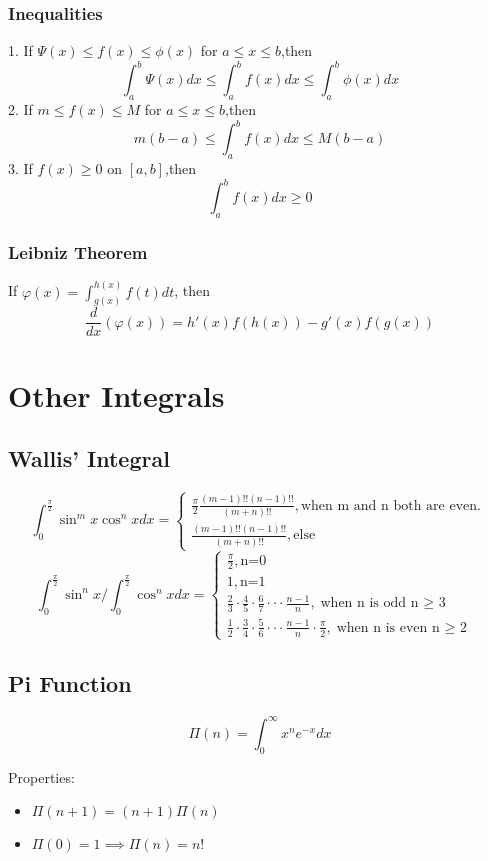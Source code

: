 \documentclass[12pt]{article}
\begin{document}
\subsubsection{Inequalities}
1. If $\Psi(x) \le f(x) \le \phi(x)$  for $a \le x \le b$,then
$$\int_{a}^{b}\Psi(x)dx \le \int_{a}^{b}f(x)dx \le \int_{a}^{b}\phi(x)dx$$
2. If $m \le f(x) \le M$ for $a \le x \le b$,then 
$$m(b-a) \le \int_{a}^{b}f(x)dx \le M(b-a)$$
3. If $f(x) \ge 0$ on $[a,b]$,then $$\int_{a}^{b}f(x)dx \ge 0$$
\subsubsection{Leibniz Theorem} 
If $\varphi(x)=\int_{g(x)}^{h(x)}f(t)dt$, then
$$\frac{d}{dx}(\varphi(x))=h'(x)f(h(x))-g'(x)f(g(x))$$
\section{Other Integrals}
\subsection{Wallis' Integral}
$$\int_{0}^{\frac{\pi}{2}} \sin^{m}x \cos^{n}xdx=
\begin{cases}
  \frac{\pi}{2}\frac{(m-1)!!(n-1)!!}{(m+n)!!}, \text{when m and n both are even.}\ \\
  
  \frac{(m-1)!!(n-1)!!}{(m+n)!!},\text{else}\
\end{cases} $$
$$\int_{0}^{\frac{\pi}{2}} \sin^{n}x /  \int_{0}^{\frac{\pi}{2}}\cos^{n}xdx=
\begin{cases}
  \frac{\pi}{2}, \text{n=0}\ \\
  1, \text{n=1}\ \\
  \frac{2}{3} \cdot \frac{4}{5} \cdot \frac{6}{7} \cdot \cdot \cdot    \frac{n-1}{n}, \text{when n is odd n $\geq$ 3 }\ \\
  \frac{1}{2} \cdot \frac{3}{4} \cdot \frac{5}{6} \cdot \cdot \cdot \frac{n-1}{n} \cdot \frac{\pi}{2}, \text{when n is even n $\geq$ 2 }\
\end{cases} $$
\subsection{Pi Function}
$$\Pi(n)= \int_{0}^{\infty}x^{n}e^{-x}dx$$

Properties:
\begin{itemize}
\item $\Pi(n+1)=(n+1) \Pi(n)$
\item $\Pi(0)=1 \implies \Pi(n)=n!$
\end{itemize}
\end{document}
